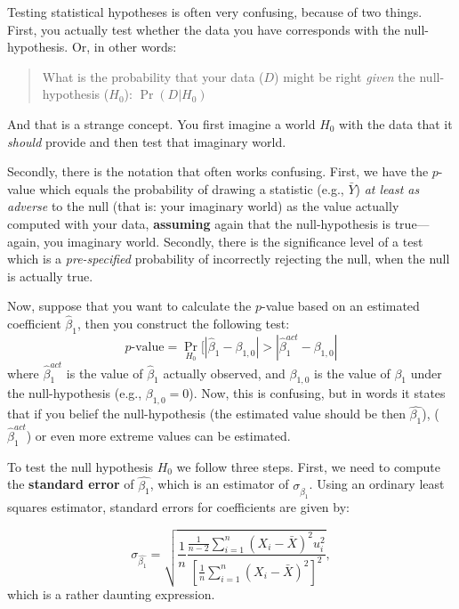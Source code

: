 \documentclass[
]{book}
\begin{document}
Testing statistical hypotheses is often very confusing, because of two things. First, you actually test whether the data you have corresponds with the null-hypothesis. Or, in other words:

\begin{quote}
What is the probability that your data (\(D\)) might be right \emph{given} the null-hypothesis (\(H_0\)): \(\Pr(D|H_0)\)
\end{quote}

And that is a strange concept. You first imagine a world \(H_0\) with the data that it \emph{should} provide and then test that imaginary world.

Secondly, there is the notation that often works confusing. First, we have the \(p\)-value which equals the probability of drawing a statistic (e.g., \(\bar{Y}\)) \emph{at least as adverse} to the null (that is: your imaginary world) as the value actually computed with your data, \textbf{assuming} again that the null-hypothesis is true---again, you imaginary world. Secondly, there is the significance level of a test which is a \emph{pre-specified} probability of incorrectly rejecting the null, when the null is actually true.

Now, suppose that you want to calculate the \(p\)-value based on an estimated coefficient \(\hat{\beta}_1\), then you construct the following test:
\begin{equation}
 p\text{-value} = \Pr_{H_0}[|\hat{\beta}_1 - \beta_{1,0}| > |\hat{\beta}_1^{act} - \beta_{1,0}| 
\end{equation}
where \(\hat{\beta}_1^{act}\) is the value of \(\hat{\beta}_1\) actually observed, and \(\beta_{1,0}\) is the value of \(\beta_1\) under the null-hypothesis (e.g., \(\beta_{1,0} = 0\)). Now, this is confusing, but in words it states that if you belief the null-hypothesis (the estimated value should be then \(\hat{\beta_1}\)), (\(\hat{\beta}_1^{act}\)) or even more extreme values can be estimated.

To test the null hypothesis \(H_0\) we follow three steps. First, we need to compute the \textbf{standard error} of \(\hat{\beta_1}\), which is an estimator of \(\sigma_{\hat{\beta_1}}\). Using an ordinary least squares estimator, standard errors for coefficients are given by:

\begin{equation}
\sigma_{\hat{\beta_1}} = \sqrt{\frac{1}{n} \frac{\frac{1}{n-2} \sum_{i=1}^n (X_i - \bar{X})^2 u_i^2}{\left[\frac{1}{n} \sum_{i=1}^n (X_i - \bar{X})^2 \right]^2}},
\label{eq:olsse}
\end{equation}
which is a rather daunting expression.
\end{document}
